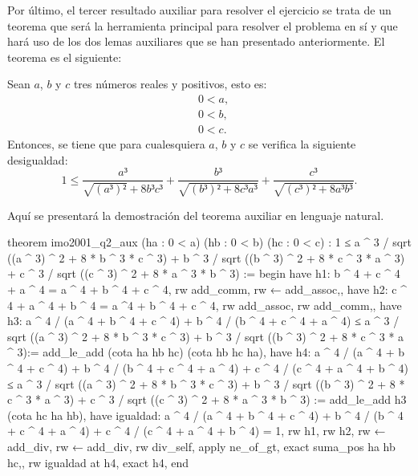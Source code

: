 Por último, el tercer resultado auxiliar para resolver el ejercicio
se trata de un teorema que será la herramienta principal para
resolver el problema en sí y que hará uso de los dos lemas auxiliares
que se han presentado anteriormente. El teorema es el siguiente:
\begin{teorema}
  Sean \(a\), \(b\) y \(c\) tres números reales y positivos, esto es:
  \begin{align}
    &0<a, \label{haq2t}\tag{ha}\\
    &0<b, \label{hbq2t}\tag{hb}\\
    &0<c. \label{hcq2t}\tag{hc}
  \end{align}
  Entonces, se tiene que para cualesquiera \(a\), \(b\) y \(c\) se
  verifica la siguiente desigualdad:
  \begin{equation}
    1≤\frac{a³}{\sqrt{(a³)²}+8b³c³}+\frac{b³}{\sqrt{(b³)²+8c³a³}}+
    \frac{c³}{\sqrt{(c³)²+8a³b³}}.
  \end{equation}
\end{teorema}

\begin{demostracion}
  Aquí se presentará la demostración del teorema auxiliar en lenguaje
  natural.
\end{demostracion}

\begin{leancode}
theorem imo2001_q2_aux (ha : 0 < a) (hb : 0 < b) (hc : 0 < c) :
  1 ≤ a ^ 3 / sqrt ((a ^ 3) ^ 2 + 8 * b ^ 3 * c ^ 3) +
      b ^ 3 / sqrt ((b ^ 3) ^ 2 + 8 * c ^ 3 * a ^ 3) +
      c ^ 3 / sqrt ((c ^ 3) ^ 2 + 8 * a ^ 3 * b ^ 3) :=
begin
  have h1: b ^ 4 + c ^ 4 + a ^ 4 = a ^ 4 + b ^ 4 + c ^ 4,
  {rw add_comm,
   rw ← add_assoc,},
  have h2: c ^ 4 + a ^ 4 + b ^ 4 = a ^4 + b ^ 4 + c ^ 4,
  {rw add_assoc,
   rw add_comm,},
  have h3: a ^ 4 / (a ^ 4 + b ^ 4 + c ^ 4) + 
    b ^ 4 / (b ^ 4 + c ^ 4 + a ^ 4) ≤  
    a ^ 3 / sqrt ((a ^ 3) ^ 2 + 8 * b ^ 3 * c ^ 3) + 
    b ^ 3 / sqrt ((b ^ 3) ^ 2 + 8 * c ^ 3 * a ^ 3):= 
    add_le_add (cota ha hb hc) (cota hb hc ha),
  have h4: a ^ 4 / (a ^ 4 + b ^ 4 + c ^ 4) + 
    b ^ 4 / (b ^ 4 + c ^ 4 + a ^ 4) +
    c ^ 4 / (c ^ 4 + a ^ 4 + b ^ 4) ≤  
    a ^ 3 / sqrt ((a ^ 3) ^ 2 + 8 * b ^ 3 * c ^ 3) + 
    b ^ 3 / sqrt ((b ^ 3) ^ 2 + 8 * c ^ 3 * a ^ 3) +
    c ^ 3 / sqrt ((c ^ 3) ^ 2 + 8 * a ^ 3 * b ^ 3) :=
    add_le_add h3 (cota hc ha hb),
  have igualdad: a ^ 4 / (a ^ 4 + b ^ 4 + c ^ 4) + 
    b ^ 4 / (b ^ 4 + c ^ 4 + a ^ 4) +
    c ^ 4 / (c ^ 4 + a ^ 4 + b ^ 4) = 1,
    {rw h1,
     rw h2,
     rw ← add_div,
     rw ← add_div,
     rw div_self,
     apply ne_of_gt,
     exact suma_pos ha hb hc,},
  rw igualdad at h4,
  exact h4,
end
\end{leancode}


